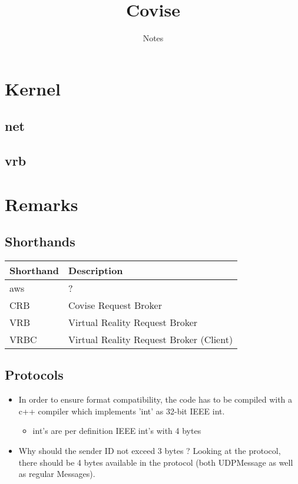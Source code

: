 \documentclass[12pt,pdftex,a4paper]{scrbook}
\newcommand{\shandentry}[2]{\label{intern::shorthands::#1} #1 & #2 \\ \hline}
\begin{document}
	\thispagestyle{empty}
	\title{Covise}
	\subtitle{Notes}
	\author{}
	\maketitle
	
	\newpage
	\tableofcontents

	\part{Kernel}
	
	\chapter{net}
	
	
	
	\chapter{vrb}

	

	\part{Remarks}

	\chapter{Shorthands}
	
	\begin{tabular}{||p{4cm}|p{10cm}||}
		\hline
		\textbf{Shorthand} & \textbf{Description}\\
		\hline
		\hline
		\shandentry{aws}{?}
		\shandentry{CRB}{Covise Request Broker}
		\shandentry{VRB}{Virtual Reality Request Broker}
		\shandentry{VRBC}{Virtual Reality Request Broker (Client)}
	\end{tabular}

	

	\chapter{Protocols}

	\begin{itemize}
		\item In order to ensure format compatibility, the code has to be compiled with a c++ compiler which implements 'int' as 32-bit IEEE int.
		\begin{itemize}
			\item int's are per definition IEEE int's with 4 bytes
		\end{itemize}
		\item Why should the sender ID not exceed 3 bytes ? Looking at the protocol, there should be 4 bytes available in the protocol (both UDPMessage as well as regular Messages). 
	\end{itemize}
\end{document}

